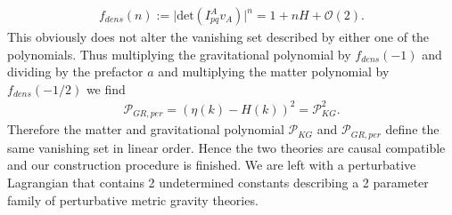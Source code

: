 \documentclass[a4paper,12pt, DIV=14, BCOR=5mm, twoside, headsepline, numbers=noenddot]{scrbook}
\begin{document}
\begin{align}
    f_{dens}(n) := \vert \mathrm{det}\left (I^A_{pq}v_A \right )\vert ^n = 1 + nH + \mathcal{O}(2).
\end{align}
This obviously does not alter the vanishing set described by either one of the polynomials. Thus multiplying the gravitational polynomial by $f_{dens}(-1)$ and dividing by the prefactor $a$ and multiplying the matter polynomial by $f_{dens}(-1/2)$ we find
\begin{align}
    \mathcal{P}_{GR,per} = (\eta(k)-H(k))^2 = \mathcal{P}_{KG}^2.
\end{align}
Therefore the matter and gravitational polynomial $\mathcal{P}_{KG}$ and $\mathcal{P}_{GR,per}$ define the same vanishing set in linear order.
Hence the two theories are causal compatible and our construction procedure is finished. We are left with a perturbative Lagrangian that contains 2 undetermined constants describing a 2 parameter family of perturbative metric gravity theories.  \\
\end{document}
